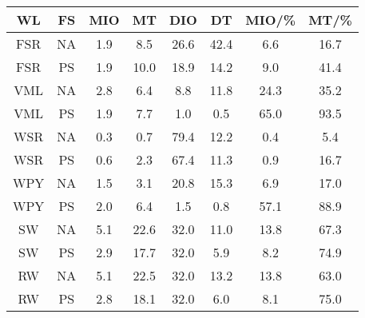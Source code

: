 \begin{tabular}{c|c|cccc|cc}
\toprule
  WL &  FS & MIO &   MT &  DIO &   DT & MIO/\% & MT/\% \\
\midrule
 FSR &  NA & 1.9 &  8.5 & 26.6 & 42.4 &    6.6 &  16.7 \\
 FSR &  PS & 1.9 & 10.0 & 18.9 & 14.2 &    9.0 &  41.4 \\
 VML &  NA & 2.8 &  6.4 &  8.8 & 11.8 &   24.3 &  35.2 \\
 VML &  PS & 1.9 &  7.7 &  1.0 &  0.5 &   65.0 &  93.5 \\
 WSR &  NA & 0.3 &  0.7 & 79.4 & 12.2 &    0.4 &   5.4 \\
 WSR &  PS & 0.6 &  2.3 & 67.4 & 11.3 &    0.9 &  16.7 \\
 WPY &  NA & 1.5 &  3.1 & 20.8 & 15.3 &    6.9 &  17.0 \\
 WPY &  PS & 2.0 &  6.4 &  1.5 &  0.8 &   57.1 &  88.9 \\
  SW &  NA & 5.1 & 22.6 & 32.0 & 11.0 &   13.8 &  67.3 \\
  SW &  PS & 2.9 & 17.7 & 32.0 &  5.9 &    8.2 &  74.9 \\
  RW &  NA & 5.1 & 22.5 & 32.0 & 13.2 &   13.8 &  63.0 \\
  RW &  PS & 2.8 & 18.1 & 32.0 &  6.0 &    8.1 &  75.0 \\
\bottomrule
\end{tabular}
